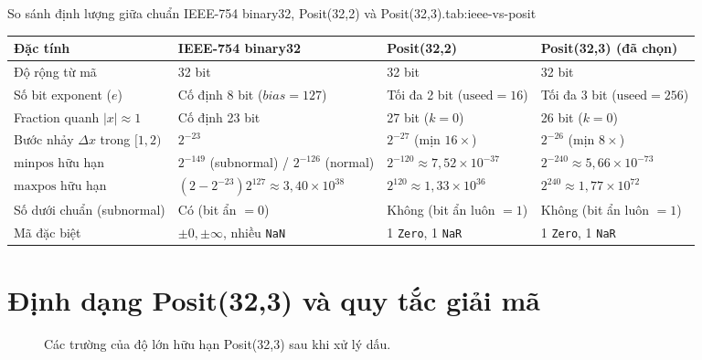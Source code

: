 \begin{engineeringtable}{So sánh định lượng giữa chuẩn IEEE-754 binary32, Posit(32,2) và Posit(32,3).}{tab:ieee-vs-posit}
\begin{tabularx}{\linewidth}{@{}>{\raggedright\arraybackslash}p{42mm} Y Y Y@{}}
\toprule
Đặc tính & IEEE-754 binary32 & Posit(32,2) & Posit(32,3) (đã chọn) \\
\midrule
Độ rộng từ mã & 32 bit & 32 bit & 32 bit \\
Số bit exponent ($e$) & Cố định 8 bit ($bias=127$) & Tối đa 2 bit ($\mathrm{useed}=16$) & Tối đa 3 bit ($\mathrm{useed}=256$) \\
Fraction quanh $|x|\approx 1$ & Cố định 23 bit & 27 bit ($k=0$) & 26 bit ($k=0$) \\
Bước nhảy $\Delta x$ trong $[1,2)$ & $2^{-23}$ & $2^{-27}$ (mịn $16\times$) & $2^{-26}$ (mịn $8\times$) \\
$\mathrm{minpos}$ hữu hạn & $2^{-149}$ (subnormal) / $2^{-126}$ (normal) & $2^{-120}\approx 7{,}52\times 10^{-37}$ & $2^{-240}\approx 5{,}66\times 10^{-73}$ \\
$\mathrm{maxpos}$ hữu hạn & $(2-2^{-23})2^{127}\approx 3{,}40\times 10^{38}$ & $2^{120}\approx 1{,}33\times 10^{36}$ & $2^{240}\approx 1{,}77\times 10^{72}$ \\
Số dưới chuẩn (subnormal) & Có (bit ẩn $=0$) & Không (bit ẩn luôn $=1$) & Không (bit ẩn luôn $=1$) \\
Mã đặc biệt & $\pm 0, \pm\infty$, nhiều \texttt{NaN} & 1 \texttt{Zero}, 1 \texttt{NaR} & 1 \texttt{Zero}, 1 \texttt{NaR} \\
\bottomrule
\end{tabularx}
\end{engineeringtable}

\section{Định dạng Posit(32,3) và quy tắc giải mã}
\begin{figure}[htbp]
  \centering
  \caption{Các trường của độ lớn hữu hạn Posit(32,3) sau khi xử lý dấu.}
  \label{fig:posit-fields}
\end{figure}

